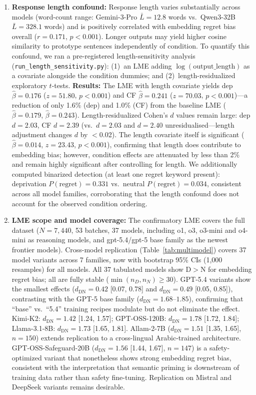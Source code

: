 \documentclass[11pt]{article}
\begin{document}
\begin{enumerate}
  \item \textbf{Response length confound:} Response length varies substantially across models (word-count range: Gemini-3-Pro $\bar{L}=12.8$ words vs.\ Qwen3-32B $\bar{L}=328.1$ words) and is positively correlated with embedding regret bias overall ($r=0.171$, $p<0.001$). Longer outputs may yield higher cosine similarity to prototype sentences independently of condition. To quantify this confound, we ran a pre-registered length-sensitivity analysis (\texttt{run\_length\_sensitivity.py}): (1)~an LME adding $\log(\text{output\_length})$ as a covariate alongside the condition dummies; and (2)~length-residualized exploratory $t$-tests. \textbf{Results:} The LME with length covariate yields dep $\hat{\beta}=0.176$ ($z=51.80$, $p<0.001$) and CF $\hat{\beta}=0.241$ ($z=70.03$, $p<0.001$)---a reduction of only 1.6\% (dep) and 1.0\% (CF) from the baseline LME ($\hat{\beta}=0.179$, $\hat{\beta}=0.243$). Length-residualized Cohen's $d$ values remain large: dep $d=2.03$, CF $d=2.39$ (vs.\ $d=2.03$ and $d=2.40$ unresidualised---length adjustment changes $d$ by $<$0.02). The length covariate itself is significant ($\hat{\beta}=0.014$, $z=23.43$, $p<0.001$), confirming that length does contribute to embedding bias; however, condition effects are attenuated by less than 2\% and remain highly significant after controlling for length. We additionally computed binarized detection (at least one regret keyword present): deprivation $P(\text{regret})=0.331$ vs.\ neutral $P(\text{regret})=0.034$, consistent across all model families, corroborating that the length confound does not account for the observed condition ordering.
  \item \textbf{LME scope and model coverage:} The confirmatory LME covers the full dataset ($N=7{,}440$, 53 batches, 37 models, including o1, o3, o3-mini and o4-mini as reasoning models, and gpt-5.4/gpt-5 base family as the newest frontier models). Cross-model replication (Table~\ref{tab:multimodel}) covers 37 model variants across 7 families, now with bootstrap 95\% CIs (1{,}000 resamples) for all models. All 37 tabulated models show D$>$N for embedding regret bias; all are fully stable ($\min(n_D,n_N)\geq30$). GPT-5.4 variants show the smallest effects ($d_\text{DN}=0.42$ [0.07, 0.78] and $d_\text{DN}=0.49$ [0.05, 0.85]), contrasting with the GPT-5 base family ($d_\text{DN}=1.68$--$1.85$), confirming that ``base'' vs.\ ``5.4'' training recipes modulate but do not eliminate the effect. Kimi-K2: $d_\text{DN}=1.42$ [1.24, 1.57]; GPT-OSS-120B: $d_\text{DN}=1.78$ [1.72, 1.84]; Llama-3.1-8B: $d_\text{DN}=1.73$ [1.65, 1.81]. Allam-2-7B ($d_\text{DN}=1.51$ [1.35, 1.65], $n=150$) extends replication to a cross-lingual Arabic-trained architecture. GPT-OSS-Safeguard-20B ($d_\text{DN}=1.56$ [1.44, 1.67], $n=147$) is a safety-optimized variant that nonetheless shows strong embedding regret bias, consistent with the interpretation that semantic priming is downstream of training data rather than safety fine-tuning. Replication on Mistral and DeepSeek variants remains desirable.


\end{enumerate}
\end{document}
